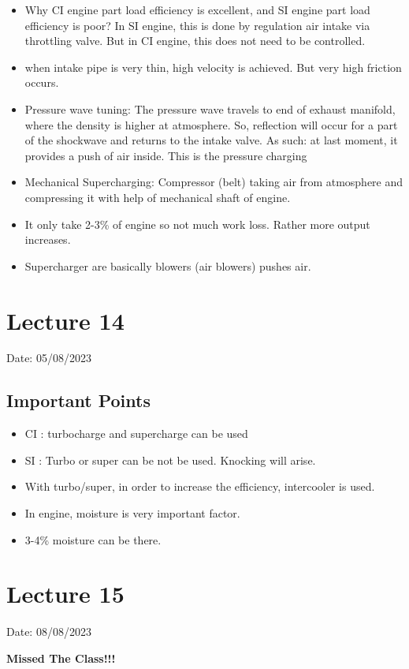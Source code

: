 \documentclass{article}
\begin{document}
\begin{multicols}{2}
\begin{itemize}
    \item Why CI engine part load efficiency is excellent, and SI engine part load efficiency is poor? In SI engine, this is done by regulation air intake via throttling valve. But in CI engine, this does not need to be controlled.
    \item when intake pipe is very thin, high velocity is achieved. But very high friction occurs.
    \item Pressure wave tuning: The pressure wave travels to end of exhaust manifold, where the density is higher at atmosphere. So, reflection will occur for a part of the shockwave and returns to the intake valve. As such: at last moment, it provides a push of air inside. This is the pressure charging
    \item Mechanical Supercharging: Compressor (belt) taking air from atmosphere and compressing it with help of mechanical shaft of engine.
    \item It only take 2-3\% of engine so not much work loss. Rather more output increases. 
    \item Supercharger are basically blowers (air blowers) pushes air. 
  \end{itemize}
\end{multicols}

\section{Lecture 14} 
\hfill Date: 05/08/2023

\subsection*{Important Points}
\begin{itemize}
  \item CI : turbocharge and supercharge can be used 
  \item SI : Turbo or super can be not be used. Knocking will arise.
  \item With turbo/super, in order to increase the efficiency, intercooler is used. 
  \item In engine, moisture is very important factor.
  \item 3-4\% moisture can be there.
\end{itemize}

\section{Lecture 15}
\hfill Date: 08/08/2023

\textbf{Missed The Class!!!}
\end{document}
